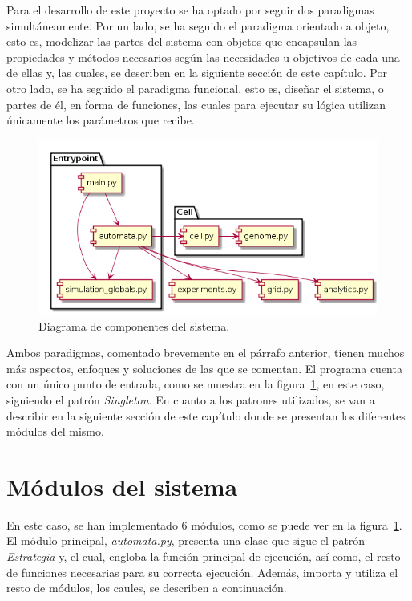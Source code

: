 Para el desarrollo de este proyecto se ha optado por seguir dos paradigmas simultáneamente. Por un lado,
se ha seguido el paradigma orientado a objeto, esto es, modelizar las partes del sistema con objetos que encapsulan
las propiedades y métodos necesarios según las necesidades u objetivos de cada una de ellas y, las cuales,
se describen en la siguiente sección de este capítulo. Por otro lado, se ha seguido el paradigma funcional, esto es,
diseñar el sistema, o partes de él, en forma de funciones, las cuales para ejecutar su lógica utilizan únicamente
los parámetros que recibe.

\begin{figure}[h]
\centering
\includegraphics[scale=0.8]{figures/architecture}
\caption{Diagrama de componentes del sistema.}
\label{fig:arch}
\end{figure}

Ambos paradigmas, comentado brevemente en el párrafo anterior, tienen muchos más aspectos, enfoques y soluciones
de las que se comentan. El programa cuenta con un único punto de entrada, como se muestra en la figura~\ref{fig:arch},
en este caso, siguiendo el patrón
\textit{Singleton}. En cuanto a los patrones utilizados, se van a describir en la siguiente sección de este
capítulo donde se presentan los diferentes módulos del mismo.

\section{Módulos del sistema}

En este caso, se han implementado $6$ módulos, como se puede ver en la figura~\ref{fig:arch}.
El módulo principal, \textit{automata.py}, presenta
una clase que sigue el patrón \textit{Estrategia} y, el cual, engloba la función principal de ejecución,
así como, el resto de funciones necesarias para su correcta ejecución. Además, importa y utiliza
el resto de módulos, los caules, se describen a continuación.

